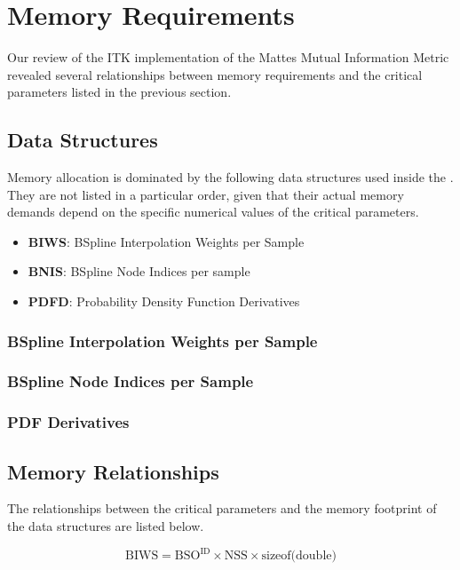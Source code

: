 \documentclass{InsightArticle}
\begin{document}
\section{Memory Requirements}
\label{sec:MemoryRequirements}

Our review of the ITK implementation of the Mattes Mutual Information Metric
revealed several relationships between memory requirements and the critical
parameters listed in the previous section.

\subsection{Data Structures}

Memory allocation is dominated by the following data structures used inside the
. They are not listed in a 
particular order, given that their actual memory demands depend on the specific
numerical values of the critical parameters.


\begin{itemize}
\item \textbf{BIWS}: BSpline Interpolation Weights per Sample
\item \textbf{BNIS}: BSpline Node Indices per sample
\item \textbf{PDFD}: Probability Density Function Derivatives
\end{itemize}


\subsubsection{BSpline Interpolation Weights per Sample}
\subsubsection{BSpline Node Indices per Sample}
\subsubsection{PDF Derivatives}

\subsection{Memory Relationships}

The relationships between the critical parameters and the memory footprint of
the data structures are listed below.

\begin{equation}
\mbox{BIWS} = \mbox{BSO}^{\mbox{ID}} \times \mbox{NSS} \times \mbox{sizeof(double)}
\end{equation}
\end{document}

